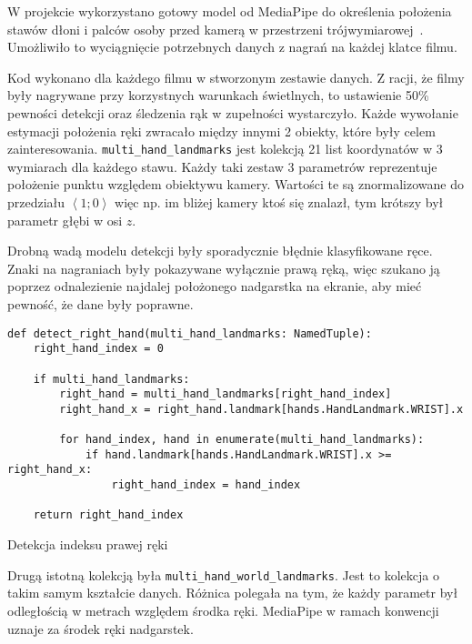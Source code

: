 W projekcie wykorzystano gotowy model od MediaPipe do określenia położenia stawów dłoni i palców osoby przed kamerą w przestrzeni trójwymiarowej~\cite{vakunov2020}. Umożliwiło to wyciągnięcie potrzebnych danych z nagrań na każdej klatce filmu.

Kod wykonano dla każdego filmu w stworzonym zestawie danych. Z racji, że filmy były nagrywane przy korzystnych warunkach świetlnych, to ustawienie 50\% pewności detekcji oraz śledzenia rąk w zupełności wystarczyło. Każde wywołanie estymacji położenia ręki zwracało między innymi 2 obiekty, które były celem zainteresowania. \texttt{multi_hand_landmarks} jest kolekcją 21 list koordynatów w 3 wymiarach dla każdego stawu. Każdy taki zestaw 3 parametrów reprezentuje położenie punktu względem obiektywu kamery. Wartości te są znormalizowane do przedziału $\left\langle1;0\right\rangle$ więc np. im bliżej kamery ktoś się znalazł, tym krótszy był parametr głębi w osi $z$.

Drobną wadą modelu detekcji były sporadycznie błędnie klasyfikowane ręce. Znaki na nagraniach były pokazywane wyłącznie prawą ręką, więc szukano ją poprzez odnalezienie najdalej położonego nadgarstka na ekranie, aby mieć pewność, że dane były poprawne.

\begin{listing}[H]
    \color{white}
    \begin{verbatim}
def detect_right_hand(multi_hand_landmarks: NamedTuple):
    right_hand_index = 0

    if multi_hand_landmarks:
        right_hand = multi_hand_landmarks[right_hand_index]
        right_hand_x = right_hand.landmark[hands.HandLandmark.WRIST].x

        for hand_index, hand in enumerate(multi_hand_landmarks):
            if hand.landmark[hands.HandLandmark.WRIST].x >= right_hand_x:
                right_hand_index = hand_index

    return right_hand_index
    \end{verbatim}
    \caption{Detekcja indeksu prawej ręki}
    \label{lst:right-hand-detection}
\end{listing}

Drugą istotną kolekcją była \texttt{multi_hand_world_landmarks}. Jest to kolekcja o takim samym kształcie danych. Różnica polegała na tym, że każdy parametr był odległością w metrach względem środka ręki. MediaPipe w ramach konwencji uznaje za środek ręki nadgarstek.

